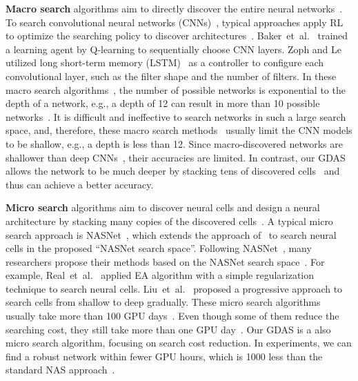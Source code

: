 \documentclass[10pt,twocolumn,letterpaper]{article}
\begin{document}
\textbf{Macro search} algorithms aim to directly discover the entire neural networks~\cite{cai2018efficient,brock2018smash,Véniat_2018_CVPR,zoph2017NAS,li2019partial}.
To search convolutional neural networks (CNNs)~\cite{krizhevsky2012imagenet}, typical approaches apply RL to optimize the searching policy to discover architectures~\cite{baker2017designing,cai2018efficient,zoph2017NAS,pmlr-v80-pham18a}.
Baker~et~al.~\cite{baker2017designing} trained a learning agent by Q-learning to sequentially choose CNN layers.
Zoph and Le~\cite{zoph2017NAS} utilized long short-term memory (LSTM)~\cite{hochreiter1997long} as a controller to configure each convolutional layer, such as the filter shape and the number of filters.
In these macro search algorithms~\cite{baker2017designing,cai2018efficient,zoph2017NAS}, the number of possible networks is exponential to the depth of a network, e.g., a depth of 12 can result in more than 10 possible networks~\cite{pmlr-v80-pham18a}.
It is difficult and ineffective to search networks in such a large search space, and, therefore, these macro search methods~\cite{pmlr-v80-pham18a,zoph2017NAS,cai2018efficient} usually limit the CNN models to be shallow, e.g., a depth is less than 12.
Since macro-discovered networks are shallower than deep CNNs~\cite{he2016deep,huang2017densely}, their accuracies are limited.
In contrast, our GDAS allows the network to be much deeper by stacking tens of discovered cells~\cite{Zoph_2018_CVPR} and thus can achieve a better accuracy.




\textbf{Micro search} algorithms aim to discover neural cells and design a neural architecture by stacking many copies of the discovered cells~\cite{Zoph_2018_CVPR,real2019regularized,real2017large,pmlr-v80-pham18a}.
A typical micro search approach is NASNet~\cite{Zoph_2018_CVPR}, which extends the approach of~\cite{zoph2017NAS} to search neural cells in the proposed ``NASNet search space''.
Following NASNet~\cite{Zoph_2018_CVPR}, many researchers propose their methods based on the NASNet search space~\cite{Liu_2018_ECCV,liu2019darts,cai2018efficient,real2019regularized}.
For example, Real~et~al.~\cite{real2019regularized} applied EA algorithm with a simple regularization technique to search neural cells.
Liu~et~al.~\cite{Liu_2018_ECCV} proposed a progressive approach to search cells from shallow to deep gradually.
These micro search algorithms usually take more than 100 GPU days~\cite{Liu_2018_ECCV,Zoph_2018_CVPR}.
Even though some of them reduce the searching cost, they still take more than one GPU day~\cite{liu2019darts}.
Our GDAS is a also micro search algorithm, focusing on search cost reduction. In experiments, we can find a robust network within fewer GPU hours, which is 1000 less than the standard NAS approach~\cite{Zoph_2018_CVPR}.
\end{document}
